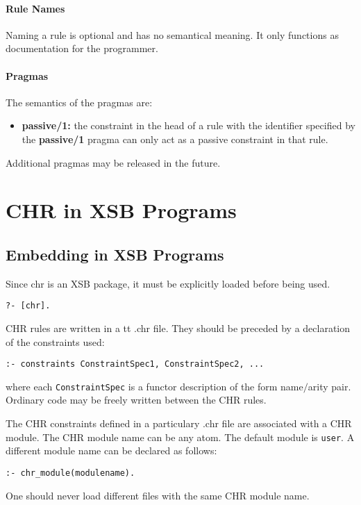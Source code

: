 \paragraph{Rule Names}
Naming a rule is optional and has no semantical meaning. It only functions
as documentation for the programmer.

\paragraph{Pragmas}
The semantics of the pragmas are:
\begin{itemize}
\item \textbf{passive/1:} the constraint in the head of a rule with the identifier specified by
                          the \textbf{passive/1} pragma can only act as a passive constraint in that rule.
\end{itemize}
Additional pragmas may be released in the future.

\section{CHR in XSB Programs} \label{practical}

\subsection{Embedding in XSB Programs}

Since chr is an XSB package, it must be explicitly loaded before being
used.
\begin{verbatim}
?- [chr].
\end{verbatim}

CHR rules are written in a {tt .chr} file. They should be preceded by
a declaration of the constraints used: 
\begin{verbatim}
:- constraints ConstraintSpec1, ConstraintSpec2, ...
\end{verbatim}
where each \texttt{ConstraintSpec} is a functor description of the form name$\slash$arity pair. Ordinary code
may be freely written between the CHR rules.

The CHR constraints defined in a particulary .chr file are associated
with a CHR module. The CHR module name can be any atom. The default module is
\texttt{user}. A different module name can be declared as follows:
\begin{verbatim}
:- chr_module(modulename).
\end{verbatim}
One should never load different files with the same CHR module name.


